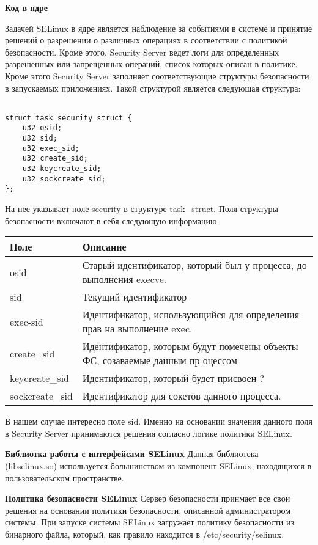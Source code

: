 \bigskip
{\bfseries Код в ядре}

Задачей SELinux в ядре является наблюдение за событиями в системе и 
принятие решений о разрешении о различных операциях в соответствии с 
политикой безопасности. Кроме этого, Security Server ведет логи для 
определенных разрешенных или запрещенных операций, список которых 
описан в политике. Кроме этого Security Server заполняет соответствующие 
структуры безопасности в запускаемых приложениях. Такой структурой 
является следующая структура: 

\bigskip 
\begin{lstlisting}
	
struct task_security_struct {
	u32 osid;		
	u32 sid;	
	u32 exec_sid;		
	u32 create_sid;		
	u32 keycreate_sid;	
	u32 sockcreate_sid;	
};

\end{lstlisting}

\bigskip
На нее указывает поле security в структуре task\_struct. Поля 
структуры безопасности включают в себя следующую информацию: 

\begin{tabular}{|p{3cm}|p{9cm}|}
\hline 
\ttfamily Поле 
& 
Описание \\ 
\hline
osid
& 
Старый идентификатор, который был у процесса, до выполнения execve. \\

\hline
sid
& 
Текущий идентификатор \\
\hline
exec-sid
&
Идентификатор, использующийся для определения прав на выполнение exec.
 \\
\hline
create\_sid 
&
Идентификатор, которым будут помечены объекты ФС, созаваемые данным пр
оцессом \\
\hline
keycreate\_sid
& 
Идентификатор, который будет присвоен ? \\ 
\hline
sockcreate\_sid  
&
Идентификатор для сокетов данного процесса. \\ 
\hline
\end {tabular}

\bigskip
В нашем случае интересно поле sid. Именно на основании значения 
данного поля в Security Server принимаются решения согласно логике политики 
SELinux. 

\bigskip
{\bfseries Библиотка работы с интерфейсами SELinux} 
Данная библиотека (libselinux.so) используется большинством из 
компонент SELinux, находящихся в пользовательском пространстве.

\bigskip
{\bfseries Политика безопасности SELinux} 
Сервер безопасности принмает все свои решения на основании политики 
безопасности, описанной администратором системы. При запуске системы 
SELinux загружает политику безопасности из бинарного файла, который, 
как правило находится в /etc/security/selinux. 

